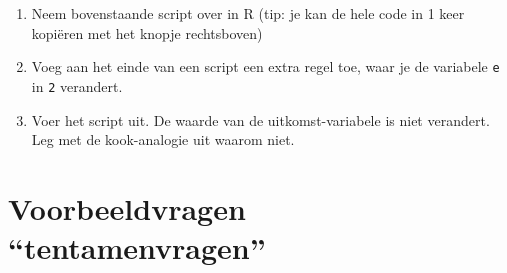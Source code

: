 \documentclass[
  b5paper,
  DIV=11,
  numbers=noendperiod]{scrreprt}
\providecommand{\tightlist}{%
  \setlength{\itemsep}{0pt}\setlength{\parskip}{0pt}}\usepackage{longtable,booktabs,array}
\theoremstyle{definition}
\theoremstyle{remark}
\begin{document}
\begin{enumerate}
\def\labelenumi{\arabic{enumi}.}
\tightlist
\item
  Neem bovenstaande script over in R (tip: je kan de hele code in 1 keer
  kopiëren met het knopje rechtsboven)
\item
  Voeg aan het einde van een script een extra regel toe, waar je de
  variabele \texttt{e} in \texttt{2} verandert.
\item
  Voer het script uit. De waarde van de uitkomst-variabele is niet
  verandert. Leg met de kook-analogie uit waarom niet.
\end{enumerate}

\section{Voorbeeldvragen
``tentamenvragen''}\label{voorbeeldvragen-tentamenvragen}
\end{document}
